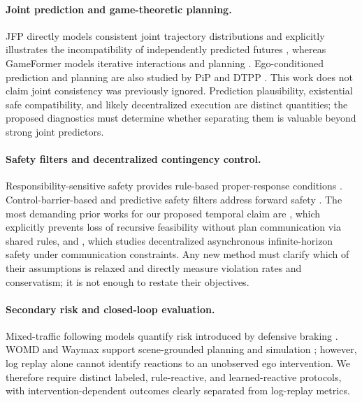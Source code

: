 \documentclass[10pt]{article}
\begin{document}
\paragraph{Joint prediction and game-theoretic planning.}
JFP directly models consistent joint trajectory distributions and explicitly illustrates the incompatibility of independently predicted futures \parencite{luo2023jfp}, whereas GameFormer models iterative interactions and planning \parencite{huang2023gameformer}. Ego-conditioned prediction and planning are also studied by PiP and DTPP \parencite{song2020pip,huang2024dtpp}. This work does not claim joint consistency was previously ignored. Prediction plausibility, existential safe compatibility, and likely decentralized execution are distinct quantities; the proposed diagnostics must determine whether separating them is valuable beyond strong joint predictors.

\paragraph{Safety filters and decentralized contingency control.}
Responsibility-sensitive safety provides rule-based proper-response conditions \parencite{shalev2017formal}. Control-barrier-based and predictive safety filters address forward safety \parencite{ames2017cbf,wabersich2021predictive}. The most demanding prior works for our proposed temporal claim are \textcite{studt2026decentralized}, which explicitly prevents loss of recursive feasibility without plan communication via shared rules, and \textcite{vielmetti2026r3r}, which studies decentralized asynchronous infinite-horizon safety under communication constraints. Any new method must clarify which of their assumptions is relaxed and directly measure violation rates and conservatism; it is not enough to restate their objectives.

\paragraph{Secondary risk and closed-loop evaluation.}
Mixed-traffic following models quantify risk introduced by defensive braking \parencite{liu2025secondary}. WOMD and Waymax support scene-grounded planning and simulation \parencite{ettinger2021large,gulino2023waymax}; however, log replay alone cannot identify reactions to an unobserved ego intervention. We therefore require distinct labeled, rule-reactive, and learned-reactive protocols, with intervention-dependent outcomes clearly separated from log-replay metrics.
\end{document}
